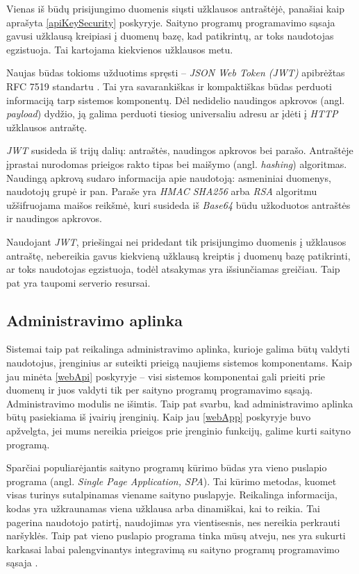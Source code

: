 \documentclass{VUMIFPSkursinis}
\begin{document}
Vienas iš būdų prisijungimo duomenis siųsti užklausos antraštėjė, panašiai kaip aprašyta \ref{apiKeySecurity} poskyryje. Saityno programų programavimo sąsaja gavusi užklausą kreipiasi į duomenų bazę, kad patikrintų, ar toks naudotojas egzistuoja. Tai kartojama kiekvienos užklausos metu.

Naujas būdas tokioms užduotims spręsti – \textit{JSON Web Token (JWT)}  apibrėžtas RFC 7519 standartu \cite{jwtRef}. Tai yra savarankiškas ir kompaktiškas būdas perduoti informaciją tarp sistemos komponentų. Dėl nedidelio naudingos apkrovos (angl. \textit{payload}) dydžio, ją galima perduoti tiesiog universaliu adresu ar įdėti į \textit{HTTP} užklausos antraštę.

\textit{JWT} susideda iš trijų dalių: antraštės, naudingos apkrovos bei parašo. Antraštėje įprastai nurodomas prieigos rakto tipas bei maišymo (angl. \textit{hashing}) algoritmas. Naudingą apkrovą sudaro informacija apie naudotoją: asmeniniai duomenys, naudotojų grupė ir pan. Paraše yra \textit{HMAC SHA256} arba \textit{RSA} algoritmu užšifruojama maišos reikšmė, kuri susideda iš \textit{Base64} būdu užkoduotos antraštės ir naudingos apkrovos.

Naudojant \textit{JWT}, priešingai nei pridedant tik prisijungimo duomenis į užklausos antraštę, nebereikia gavus kiekvieną užklausą kreiptis į duomenų bazę patikrinti, ar toks naudotojas egzistuoja, todėl atsakymas yra išsiunčiamas greičiau. Taip pat yra taupomi serverio resursai. 

\subsection{Administravimo aplinka}

Sistemai taip pat reikalinga administravimo aplinka, kurioje galima būtų valdyti naudotojus, įrenginius ar suteikti prieigą naujiems sistemos komponentams. Kaip jau minėta \ref{webApi} poskyryje – visi sistemos komponentai gali prieiti prie duomenų ir juos valdyti tik per saityno programų programavimo sąsają. Administravimo modulis ne išimtis. Taip pat svarbu, kad administravimo aplinka būtų pasiekiama iš įvairių įrenginių. Kaip jau \ref{webApp} poskyryje buvo apžvelgta, jei mums nereikia prieigos prie įrenginio funkcijų, galime kurti saityno programą.

Sparčiai populiarėjantis saityno programų kūrimo būdas yra vieno puslapio programa (angl. \textit{Single Page Application, SPA}). Tai kūrimo metodas, kuomet visas turinys sutalpinamas viename saityno puslapyje. Reikalinga informacija, kodas yra užkraunamas viena užklausa arba dinamiškai, kai to reikia. Tai pagerina naudotojo patirtį, naudojimas yra vientisesnis, nes nereikia perkrauti naršyklės. Taip pat vieno puslapio programa tinka mūsų atveju, nes yra sukurti karkasai labai palengvinantys integravimą su saityno programų programavimo sąsaja \cite{spa}.
\end{document}
